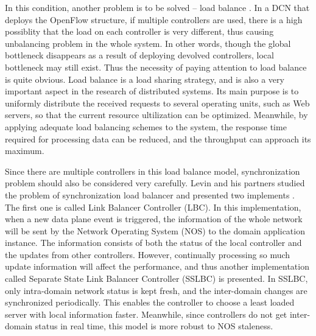 In this condition, another problem is to be solved -- load balance \cite{lwc}. In a DCN that deploys the OpenFlow structure, if multiple controllers are used, there is a high possiblity that the load on each controller is very different, thus causing unbalancing problem in the whole system. In other words, though the global bottleneck disappears as a result of deploying devolved controllers, local bottleneck may still exist. Thus the necessity of paying attention to load balance is quite obvious. Load balance is a load sharing strategy, and is also a very important aspect in the research of distributed systems. Its main purpose is to uniformly distribute the received requests to several operating units, such as Web servers, so that the current resource ultilization can be optimized. Meanwhile, by applying adequate load balancing schemes to the system, the response time required for processing data can be reduced, and the throughput can approach its maximum. 

Since there are multiple controllers in this load balance model, synchronization problem should also be considered very carefully. Levin and his partners studied the problem of synchronization load balancer and presented two implements \cite{localcen}. The first one is called Link Balancer Controller (LBC). In this implementation, when a new data plane event is triggered, the information of the whole network will be sent by the Network Operating System (NOS) to the domain application instance. The information consists of both the status of the local controller and the updates from other controllers. However, continually processing so much update information will affect the performance, and thus another implementation called Separate State Link Balancer Controller (SSLBC) is presented. In SSLBC, only intra-domain network status is kept fresh, and the inter-domain changes are synchronized periodically. This enables the controller to choose a least loaded server with local information faster. Meanwhile, since controllers do not get inter-domain status in real time, this model is more robust to NOS staleness. 


